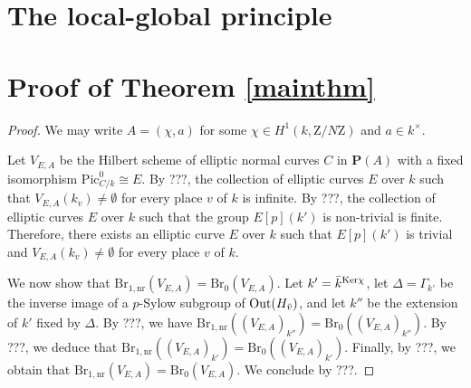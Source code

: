 \documentclass[10pt,letterpaper,twoside]{article}
\newcommand{\Z}{\mathrm{Z}}
\renewcommand{\1}{\mathbf{1}}
\newcommand{\bP}{\mathbf{P}}
\newcommand{\nr}{\mathrm{nr}}
\newcommand{\Pic}{\mathrm{Pic}}
\newcommand{\Br}{\mathrm{Br}}
\newcommand{\iso}{\cong}
\theoremstyle{plain}
\theoremstyle{plain}
\theoremstyle{definition}
\theoremstyle{named}
\theoremstyle{definition}
\begin{document}
\section{The local-global principle}


\section{Proof of Theorem \ref{mainthm}}

\begin{proof}
    We may write $A=(\chi,a)$ for some $\chi\in H^1(k,\Z/N\Z)$ and $a\in k^\times$. 
    
    Let $V_{E,A}$ be the Hilbert scheme of elliptic normal curves $C$ in $\bP(A)$ with a fixed isomorphism $\Pic_{C/k}^0\iso E$. By ???, the collection of elliptic curves $E$ over $k$ such that $V_{E,A}(k_v)\neq \emptyset$ for every place $v$ of $k$ is infinite. By ???, the collection of elliptic curves $E$ over $k$ such that the group $E[p](k')$ is non-trivial is finite. Therefore, there exists an elliptic curve $E$ over $k$ such that $E[p](k')$ is trivial and $V_{E,A}(k_v)\neq \emptyset$ for every place $v$ of $k$.

    We now show that $\Br_{1,\nr}(V_{E,A})=\Br_0(V_{E,A})$. Let $k'=\Bar{k}^{\mathrm{Ker}\chi}$, let $\Delta= \Gamma_{k'}$ be the inverse image of a $p$-Sylow subgroup of $\mathrm{Out}(H_{\Bar{v}})$, and let $k''$ be the extension of $k'$ fixed by $\Delta$. By ???, we have $\Br_{1,\nr}((V_{E,A})_{k''})=\Br_0((V_{E,A})_{k''})$. By ???, we deduce that $\Br_{1,\nr}((V_{E,A})_{k'})=\Br_0((V_{E,A})_{k'})$. Finally, by ???, we obtain that $\Br_{1,\nr}(V_{E,A})=\Br_0(V_{E,A})$. We conclude by ???.
    \end{proof}


\small


\end{document}
